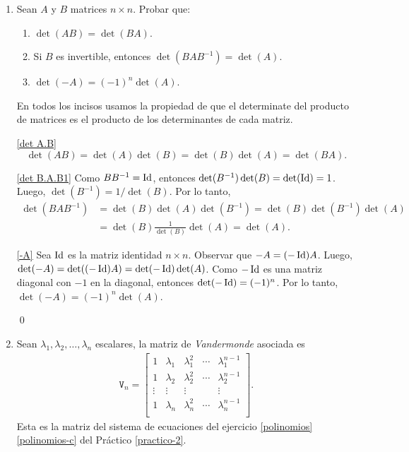 \begin{enumerate}[topsep=6pt,itemsep=.4cm]
    \item Sean $A$ y  $B$ matrices $n \times n$. Probar que:
    \begin{enumerate}
        \item\label{det A.B} $\det(AB) = \det (BA)$.
        \item\label{det B.A.B1} Si $B$ es invertible, entonces $\det(B A B^{-1}) = \det (A)$.
        \item\label{-A} $\det(-A) = (-1)^n\det (A)$.
    \end{enumerate} 
    \rta En todos los incisos usamos la propiedad de que el determinate del producto de matrices es el producto de los determinantes de cada matriz.


    \ref{det A.B} 
    $$
    \det(AB) = \det(A)\det(B) = \det(B)\det(A) = \det(BA).
    $$

    \ref{det B.A.B1} Como $BB^{-1} = \operatorname{Id}$, entonces $\det(B^{-1})\det(B) = \det(\operatorname{Id}) = 1$. Luego, $\det(B^{-1}) = 1/\det(B)$. Por lo tanto,
    \begin{align*}
        \det(B A B^{-1}) &= \det(B)\det(A)\det(B^{-1}) = \det(B)\det(B^{-1})\det(A)\\ &=  \det(B)\frac1{\det(B)}\det(A)=\det(A).
    \end{align*}
    

    \ref{-A} Sea $\operatorname{Id}$ es la matriz identidad $n \times n$. Observar que $-A = (-\operatorname{Id})A$. Luego, $\det(-A) = \det((-\operatorname{Id})A) = \det(-\operatorname{Id})\det(A)$. Como $-\operatorname{Id}$ es una matriz diagonal con $-1$ en la diagonal, entonces $\det(-\operatorname{Id}) = (-1)^n$. Por lo tanto, $\det(-A) = (-1)^n\det(A)$.

    \qed
    
    \item\label{vandermonde} Sean $\lambda_1, \lambda_2, \dots, \lambda_n$ escalares, la matriz de \emph{Vandermonde} asociada es
    \begin{align*}
    \mathtt V_n = \begin{bmatrix}
    1 & \lambda_1 & \lambda_1^2 & \cdots & \lambda_1^{n-1}\\
    1 & \lambda_2 & \lambda_2^2 & \cdots & \lambda_2^{n-1}\\
    \vdots &\vdots &\vdots & &\vdots\\
    1 & \lambda_n & \lambda_n^2 & \cdots & \lambda_n^{n-1}\\
    \end{bmatrix}.
    \end{align*}
    Esta es la matriz del sistema de ecuaciones del ejercicio \ref{polinomios}\,\ref{polinomios-c} del Práctico \ref{practico-2}.
    

\end{enumerate}
